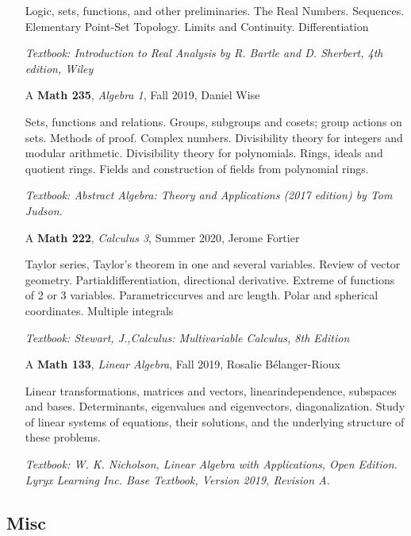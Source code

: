 \documentclass{scrartcl}
\begin{document}
\begin{itemize}
  Logic, sets, functions, and other preliminaries. The Real Numbers. Sequences. Elementary Point-Set Topology. Limits and Continuity. Differentiation

  
  \textit{\small Textbook: Introduction to Real Analysis by R. Bartle and D. Sherbert, 4th edition, Wiley}
  \item[A] \textbf{Math 235}, \textit{Algebra 1}, Fall 2019, Daniel Wise 
  
  Sets, functions and relations. Groups, subgroups and cosets; group actions on sets. Methods of proof. Complex numbers. Divisibility theory for integers and modular arithmetic. Divisibility theory for polynomials. Rings, ideals and quotient rings. Fields and construction of fields from polynomial rings. 

  \textit{\small Textbook: Abstract Algebra: Theory and Applications (2017 edition) by Tom Judson.}

  \item[A] \textbf{Math 222}, \textit{Calculus 3}, Summer 2020, Jerome Fortier
  
    Taylor series, Taylor’s theorem in one and several variables. Review of vector geometry. Partialdifferentiation, directional derivative.  Extreme of functions of 2 or 3 variables.  Parametriccurves and arc length. Polar and spherical coordinates. Multiple integrals
  
  \textit{\small Textbook: Stewart, J.,Calculus: Multivariable Calculus, 8th Edition}
  

  \item[A] \textbf{Math 133}, \textit{Linear Algebra}, Fall 2019, Rosalie Bélanger-Rioux 
  
  Linear transformations, matrices and vectors, linearindependence, subspaces and bases. Determinants, eigenvalues and eigenvectors, diagonalization. Study of linear systems of equations, their solutions, and the underlying structure of these problems.
  
  \textit{\small Textbook: W. K. Nicholson, Linear Algebra with Applications, Open Edition. Lyryx Learning Inc. Base Textbook, Version 2019, Revision A.}
  
\end{itemize} 

\subsection*{Misc}
\end{document}
